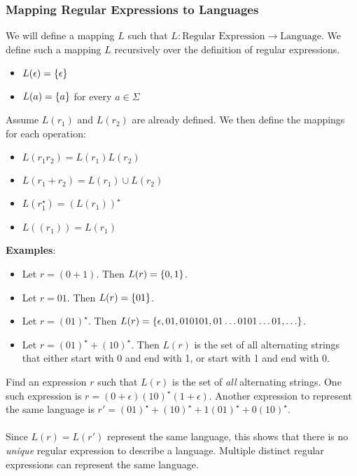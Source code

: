 \documentclass[]{article}
\DeclarePairedDelimiter{\set}{\lbrace}{\rbrace}
\theoremstyle{definition}
\begin{document}
        \subsubsection{Mapping Regular Expressions to Languages}
          We will define a mapping $L$ such that $L: \text{Regular Expression} \to \text{Language}$. We define such a mapping $L$ recursively over the definition of regular expressions.

          \begin{itemize}
            \item $L(\epsilon) = \set{ \epsilon }$
            \item $L(a) = \set{ a }$ for every $a \in \Sigma$
          \end{itemize}

          Assume $L(r_1)$ and $L(r_2)$ are already defined. We then define the mappings for each operation:
          \begin{itemize}
            \item $L(r_1 r_2) = L(r_1) L(r_2)$
            \item $L(r_1 + r_2) = L(r_1) \cup L(r_2)$
            \item $L(r_1^\star) = (L(r_1))^\star$
            \item $L((r_1)) = L(r_1)$
          \end{itemize}

          \noindent \textbf{Examples}:
          \begin{itemize}
            \item Let $r = (0 + 1)$. Then $L(r) = \set{0, 1}$.
            \item Let $r = 01$. Then $L(r) = \set{01}$.
            \item Let $r = (01)^\star$. Then $L(r) = \set{ \epsilon, 01, 010101, 01\ldots0101\ldots01, \ldots}$.
            \item Let $r = (01)^\star + (10)^\star$. Then $L(r)$ is the set of all alternating strings that either start with 0 and end with 1, or start with 1 and end with 0.
          \end{itemize}

          Find an expression $r$ such that $L(r)$ is the set of \emph{all} alternating strings. One such expression is $r = (0 + \epsilon)(10)^\star(1 + \epsilon)$. Another expression to represent the same language is $r' = (01)^\star + (10)^\star + 1(01)^\star + 0(10)^\star$.
          \\ \\
          Since $L(r) = L(r')$ represent the same language, this shows that there is no \emph{unique} regular expression to describe a language. Multiple distinct regular expressions can represent the same language.
\end{document}
